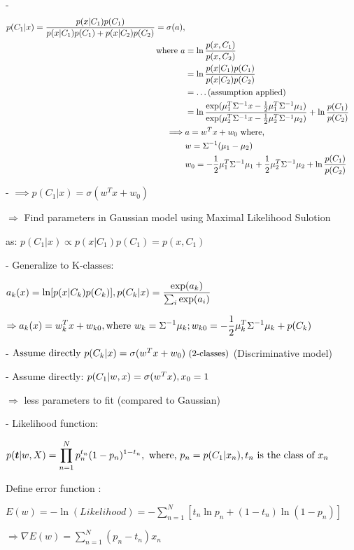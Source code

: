 - \begin{align*} \displaystyle p(C_1|x)=\frac{p(x|C_1)p(C_1)}{p(x|C_1)p(C_1)+p(x|C_2)p(C_2)} = \sigma (a), \\  \text{where } a &=\ln \frac {p(x,C_1)}{p(x,C_2)} \\ &= \ln \frac {p(x|C_1)p(C_1)}{p(x|C_2)p(C_2)} \\ &= \dots \text{(assumption applied)} \\ &= \ln \frac {\text{exp}(\mu_1^T\Sigma^{-1}x - \frac 12 \mu_1^T\Sigma^{-1}\mu_1)}{\text{exp}(\mu_2^T\Sigma^{-1}x - \frac 12 \mu_2^T\Sigma^{-1}\mu_2)} + \ln \frac {p(C_1)}{p(C_2)}  \\ \implies & a = w^Tx+w_0  \text{ where, } \\ &\space w = \Sigma^{-1}(\mu_1-\mu_2)  \\ & \space w_0 = -\frac 12\mu_1^T\Sigma^{-1}\mu_1 + \frac 12 \mu_2^T\Sigma^{-1}\mu_2 + \ln \frac {p(C_1)}{p(C_2)} \end{align*} 

- $\displaystyle \implies p(C_1|x) = \sigma(w^Tx+w_0)$ 

$\Rightarrow$ Find parameters in Gaussian model using Maximal Likelihood Sulotion

	as: $p(C_1|x)\propto p(x|C_1)p(C_1)=p(x,C_1)$ 

- Generalize to $\text{K-classes}$:

$\displaystyle a_k(x) = \ln [p(x|C_k)p(C_k)], \space p(C_k|x) = \frac{\text{exp}(a_k)}{\sum_i \text{exp}(a_i)}$ 

$\Rightarrow \displaystyle a_k(x) = w_k^Tx+w_{k0}, \text{where } w_k=\Sigma^{-1}\mu_k; \space w_{k0} = -\frac 1 2 \mu_k^T\Sigma^{-1}\mu_k + p(C_k)$ 

- $\text{Assume directly } p(C_k|x)=\sigma(w^Tx+w_0) \small \text{ (2-classes)}$ (Discriminative model)

- Assume directly: $p(C_1|w,x) = \sigma(w^Tx), \space x_0 = 1$ 

	$\Rightarrow$ less parameters to fit (compared to Gaussian)

- Likelihood function: 

$\displaystyle p(\boldsymbol{t}|w,X) = \prod_{n=1}^Np_n^{t_n}(1-p_n)^{1-t_n}, \text{ where, } p_n=p(C_1|x_n), \space t_n \text{ is the class of } x_n$  

Define error function :

	$\displaystyle E(w) = -\ln(Likelihood) = - \sum_{n=1}^N [t_n\ln p_n + (1-t_n)\ln(1-p_n)]$ 

$\displaystyle \Rightarrow \nabla E(w)=\sum_{n=1}^N(p_n-t_n)x_n$ 

